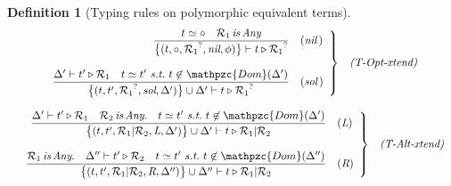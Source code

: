\documentclass[12pt]{article}
\newtheorem{Definition}{Definition}[section]
\begin{document}
\begin{Definition}[Typing rules on polymorphic equivalent terms]
\begin{displaymath}
\begin{array}{c}
      \begin{array}{rl}
        \left. \begin{array}{rl}
          \dfrac{
            t \simeq \circ
             \quad \mathcal{R}_1 \,\text{\it is}\, \text{\it Any}
          }{
            \bigl\{(t, \circ, {\mathcal{R}_1}^?, \text{\it nil}, \phi)
             \bigr\} \vdash t \triangleright {\mathcal{R}_1}^?           
          }  &  (\text{\it nil}\,)  \\
          \\
          
          \dfrac{
            \Delta' \vdash t' \triangleright \mathcal{R}_1 \quad
             t \simeq t'\ \text{\it s.t.}\
              t \not\in \mathpzc{Dom}(\Delta')
          }{
            \bigl\{(t, t', {\mathcal{R}_1}^?, \text{\it sol},
             \Delta') \bigr\} \cup \Delta' \vdash
              t \triangleright {\mathcal{R}_1}^?
          }  &  (\text{\it sol}\,)
        \end{array} \right\}  &  \text{\it (T-Opt-xtend)}
      \end{array}  \\
      \\
      
      \begin{array}{rl}
        \left. \begin{array}{rl}
          \dfrac{
            \Delta' \vdash t' \triangleright \mathcal{R}_1 \quad
             \mathcal{R}_2 \,\text{\it is}\, \text{\it Any}. \quad
              t \simeq t'\ \text{\it s.t.}\
               t \not\in \mathpzc{Dom}(\Delta')
          }{
            \bigl\{(t, t', \mathcal{R}_1|\mathcal{R}_2,
             \text{\it L}, \Delta') \bigr\} \cup \Delta' \vdash
              t \triangleright \mathcal{R}_1|\mathcal{R}_2
          }  &  (\text{\it L})  \\
          \\
          
          \dfrac{
            \mathcal{R}_1 \,\text{\it is}\, \text{\it Any}. \quad
             \Delta'' \vdash t' \triangleright \mathcal{R}_2 \quad
              t \simeq  t'\ \text{\it s.t.}\
               t \not\in \mathpzc{Dom}(\Delta'')
          }{
            \bigl\{(t, t', \mathcal{R}_1|\mathcal{R}_2,
             \text{\it R}, \Delta'') \bigr\} \cup \Delta'' \vdash
              t \triangleright \mathcal{R}_1|\mathcal{R}_2
          }  &  (\text{\it R})
        \end{array} \right\}  &  \text{\it (T-Alt-xtend)}
      \end{array}
      
    \end{array}
  \end{displaymath}
\end{Definition}
\end{document}
